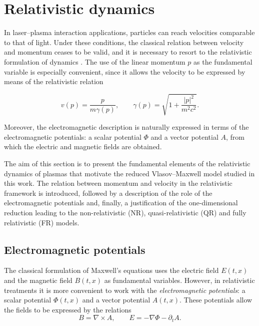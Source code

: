 \documentclass[11pt,a4paper,twoside,pdf]{article}
\numberwithin{equation}{section}
\begin{document}


\section{Relativistic dynamics}




In laser--plasma interaction applications, particles can reach
velocities comparable to that of light. Under these conditions, the classical relation between
velocity and momentum ceases to be valid, and it is necessary to resort to the
relativistic formulation of dynamics \cite{janssen2022gravitacion}. The use of the linear momentum $p$ as the fundamental variable
is especially convenient, since it allows the velocity to be expressed by means of the
relativistic relation


\[
v(p)=\frac{p}{m\gamma(p)}, \qquad
\gamma(p)=\sqrt{1+\frac{|p|^2}{m^2c^2}}.
\]




Moreover, the electromagnetic description is naturally expressed in terms
of the electromagnetic potentials: a scalar potential $\Phi$ and a vector potential
$A$, from which the electric and magnetic fields are obtained. \newline

The aim of this section is to present the fundamental elements of the relativistic
dynamics of plasmas that motivate the reduced Vlasov--Maxwell model studied
in this work. The relation between momentum and velocity
in the relativistic framework is introduced, followed by a description of the role of the electromagnetic
potentials and, finally, a justification of the one-dimensional reduction leading to
the non-relativistic (NR), quasi-relativistic (QR) and fully relativistic (FR) models.




\subsection{Electromagnetic potentials}

The classical formulation of Maxwell's equations uses the electric field
$E(t,x)$ and the magnetic field $B(t,x)$ as fundamental variables. However, in relativistic treatments it is more convenient to work with the \emph{electromagnetic
potentials}: a scalar potential $\Phi(t,x)$ and a vector potential $A(t,x)$.
These potentials allow the fields to be expressed by the relations \cite{martin2021campo}
\begin{equation}
B = \nabla \times A, \qquad
E = -\nabla \Phi - \partial_t A.
\label{eq:potenciales}
\end{equation}
\end{document}
